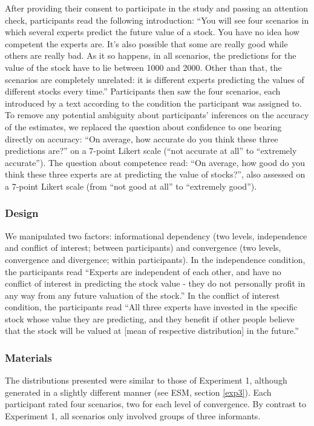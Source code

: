 \documentclass[
  doc,floatsintext]{apa6}
\begin{document}
After providing their consent to participate in the study and passing an attention check, participants read the following introduction: ``You will see four scenarios in which several experts predict the future value of a stock. You have no idea how competent the experts are. It's also possible that some are really good while others are really bad. As it so happens, in all scenarios, the predictions for the value of the stock have to lie between 1000 and 2000. Other than that, the scenarios are completely unrelated: it is different experts predicting the values of different stocks every time.'' Participants then saw the four scenarios, each introduced by a text according to the condition the participant was assigned to. To remove any potential ambiguity about participants' inferences on the accuracy of the estimates, we replaced the question about confidence to one bearing directly on accuracy: ``On average, how accurate do you think these three predictions are?'' on a 7-point Likert scale (``not accurate at all'' to ``extremely accurate''). The question about competence read: ``On average, how good do you think these three experts are at predicting the value of stocks?'', also assessed on a 7-point Likert scale (from ``not good at all'' to ``extremely good'').

\subsubsection{Design}\label{design-2}

We manipulated two factors: informational dependency (two levels, independence and conflict of interest; between participants) and convergence (two levels, convergence and divergence; within participants). In the independence condition, the participants read ``Experts are independent of each other, and have no conflict of interest in predicting the stock value - they do not personally profit in any way from any future valuation of the stock.'' In the conflict of interest condition, the participants read ``All three experts have invested in the specific stock whose value they are predicting, and they benefit if other people believe that the stock will be valued at {[}mean of respective distribution{]} in the future.''

\subsubsection{Materials}\label{materials-2}

The distributions presented were similar to those of Experiment 1, although generated in a slightly different manner (see ESM, section \ref{exp3}). Each participant rated four scenarios, two for each level of convergence. By contrast to Experiment 1, all scenarios only involved groups of three informants.
\end{document}
